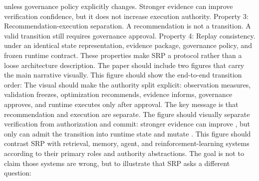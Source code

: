 {}unless governance policy explicitly changes. Stronger evidence can improve verification confidence, but it does not increase execution authority.\markdownRendererParagraphSeparator
{}Property 3: Recommendation-execution separation.\markdownRendererInterblockSeparator
{}\markdownRendererInterblockSeparator
{}A recommendation is not a transition. A valid transition still requires governance approval.\markdownRendererParagraphSeparator
{}Property 4: Replay consistency.\markdownRendererInterblockSeparator
{}\markdownRendererInterblockSeparator
{}under an identical state representation, evidence package, governance policy, and frozen runtime contract.\markdownRendererParagraphSeparator
{}These properties make SRP a protocol rather than a loose architecture description.\markdownRendererInterblockSeparator
{}
\markdownRendererSectionEnd \markdownRendererSectionBegin
{}\markdownRendererInterblockSeparator
{}The paper should include two figures that carry the main narrative visually.\markdownRendererParagraphSeparator
{} This figure should show the end-to-end transition order:\markdownRendererInterblockSeparator
{}\markdownRendererInterblockSeparator
{}The visual should make the authority split explicit: observation measures, validation freezes, optimization recommends, evidence informs, governance approves, and runtime executes only after approval. The key message is that recommendation and execution are separate.\markdownRendererInterblockSeparator
{}\markdownRendererInterblockSeparator
{}The figure should visually separate verification from authorization and commit: stronger evidence can improve , but only  can admit the transition into runtime state and mutate .\markdownRendererParagraphSeparator
{} This figure should contrast SRP with retrieval, memory, agent, and reinforcement-learning systems according to their primary roles and authority abstractions. The goal is not to claim those systems are wrong, but to illustrate that SRP asks a different question:\markdownRendererInterblockSeparator
